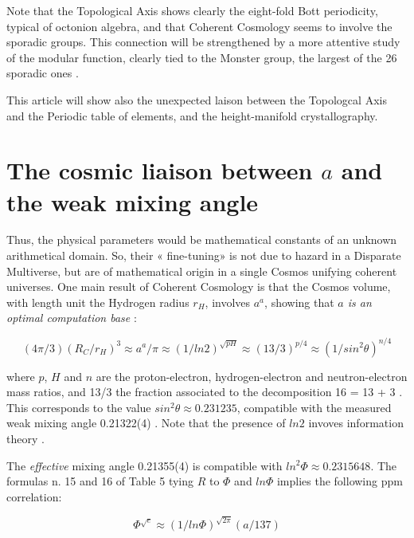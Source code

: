 \documentclass[a4paper,9pt]{article}
\begin{document}
   
   
   Note that the Topological Axis shows clearly the eight-fold Bott periodicity, typical of octonion algebra, and that Coherent Cosmology seems to involve the sporadic groups. This connection will be strengthened by a more attentive study of the modular function, clearly tied to the Monster group, the largest of the 26 sporadic ones \cite{Conway} \cite{Borcherds}.
   
   
   This article will show also the unexpected laison between the Topologcal Axis and the Periodic table of elements, and the height-manifold crystallography.
   


\section{The cosmic liaison between $a$ and the weak mixing angle}

Thus, the physical parameters would be mathematical constants of an unknown arithmetical domain. So, their « fine-tuning» is not due to hazard in a Disparate Multiverse, but are of mathematical origin in a single Cosmos unifying coherent universes. One main result of Coherent Cosmology is that the Cosmos volume, with length unit the Hydrogen radius $r_H$, involves $a^a$, showing that \textit{$a$ is an optimal computation base}  \cite{Sanchez}:

\begin{equation}
    (4\pi /3) (R_C/r_H)^3 \approx a^a/\pi \approx (1/ln2)^{\sqrt{pH}} \approx (13/3)^{p/4} \approx (1/sin^2\theta)^{n/4} 
\end{equation}

where $p$, $H$ and $n$ are the proton-electron, hydrogen-electron and neutron-electron mass ratios, and 13/3 the fraction associated to the decomposition 16 = 13 + 3 \cite{Sanchez1}. This corresponds to the value $sin^2\theta \approx 0.231235$, compatible with the measured weak mixing angle 0.21322(4) \cite{Tanabashi}. Note that the presence of $ln2$ invoves information theory \cite{Shannon}. 

The \textit {effective} mixing angle 0.21355(4) \cite{Tanabashi} is compatible with $ln^2\Phi \approx 0.2315648$. The formulas n. 15 and 16 of Table 5 tying $R$ to $\Phi$ and $ln\Phi$ implies the following ppm correlation: 

\begin{equation}
    \Phi^{\sqrt e} \approx (1/ln\Phi)^{\sqrt {2\pi}} (a/137)
\end{equation}
\end{document}
